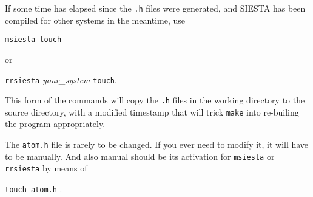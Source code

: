 If some time has elapsed since the {\tt *.h} files were
generated, and SIESTA has been compiled for other systems
in the meantime, use

{\tt msiesta touch}

\noindent
or 

{\tt rrsiesta} {\it your\_system} {\tt touch}.

\noindent
This form of the commands will copy the {\tt *.h} files in the working
directory to the source directory, with a modified timestamp that
will trick {\tt make} into re-builing the program appropriately.

The {\tt atom.h} file is rarely to be changed.
If you ever need to modify it, it will have
to be manually. And also manual should be its activation for
{\tt msiesta} or {\tt rrsiesta} by means of

{\tt touch atom.h} .






 
 
%
%

